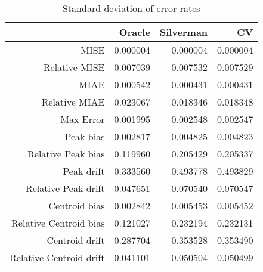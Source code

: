 \begin{table}[ht]
\centering
\begin{tabular}{rrrr}
  \hline
 & Oracle & Silverman & CV \\ 
  \hline
MISE & 0.000004 & 0.000004 & 0.000004 \\ 
  Relative MISE & 0.007039 & 0.007532 & 0.007529 \\ 
  MIAE & 0.000542 & 0.000431 & 0.000431 \\ 
  Relative MIAE & 0.023067 & 0.018346 & 0.018348 \\ 
  Max Error & 0.001995 & 0.002548 & 0.002547 \\ 
  Peak bias & 0.002817 & 0.004825 & 0.004823 \\ 
  Relative Peak bias & 0.119960 & 0.205429 & 0.205337 \\ 
  Peak drift & 0.333560 & 0.493778 & 0.493829 \\ 
  Relative Peak drift & 0.047651 & 0.070540 & 0.070547 \\ 
  Centroid bias & 0.002842 & 0.005453 & 0.005452 \\ 
  Relative Centroid bias & 0.121027 & 0.232194 & 0.232131 \\ 
  Centroid drift & 0.287704 & 0.353528 & 0.353490 \\ 
  Relative Centroid drift & 0.041101 & 0.050504 & 0.050499 \\ 
   \hline
\end{tabular}
\caption{Standard deviation of error rates} 
\label{tbl:stddev_error_rates}
\end{table}
